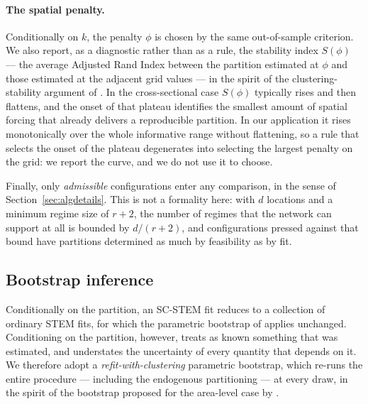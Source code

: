\paragraph{The spatial penalty.} Conditionally on $k$, the penalty $\phi$ is chosen by the same out-of-sample criterion. We also report, as a diagnostic rather than as a rule, the stability index $S(\phi)$ --- the average Adjusted Rand Index between the partition estimated at $\phi$ and those estimated at the adjacent grid values --- in the spirit of the clustering-stability argument of \citet{vonLuxburg2010}. In the cross-sectional case $S(\phi)$ typically rises and then flattens, and the onset of that plateau identifies the smallest amount of spatial forcing that already delivers a reproducible partition. In our application it rises monotonically over the whole informative range without flattening, so a rule that selects the onset of the plateau degenerates into selecting the largest penalty on the grid: we report the curve, and we do not use it to choose.

Finally, only \emph{admissible} configurations enter any comparison, in the sense of Section~\ref{sec:algdetails}. This is not a formality here: with $d$ locations and a minimum regime size of $r+2$, the number of regimes that the network can support at all is bounded by $d/(r+2)$, and configurations pressed against that bound have partitions determined as much by feasibility as by fit.

\subsection{Bootstrap inference}\label{sec:bootinf}

Conditionally on the partition, an SC-STEM fit reduces to a collection of ordinary STEM fits, for which the parametric bootstrap of \citet{FassoCameletti2010} applies unchanged. Conditioning on the partition, however, treats as known something that was estimated, and understates the uncertainty of every quantity that depends on it. We therefore adopt a \emph{refit-with-clustering} parametric bootstrap, which re-runs the entire procedure --- including the endogenous partitioning --- at every draw, in the spirit of the bootstrap proposed for the area-level case by \citet{MaranzanoMatteraSugasawa2026}.

